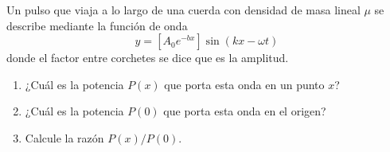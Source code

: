 \item Un pulso que viaja a lo largo de una cuerda con densidad de masa lineal $\mu$ se describe mediante la función de onda
$$ y = \left[ A_0 e^{-bx} \right] \sin(kx - \omega t) $$
donde el factor entre corchetes se dice que es la amplitud.
\begin{enumerate}
    \item ¿Cuál es la potencia $P(x)$ que porta esta onda en un punto $x$?
    \item ¿Cuál es la potencia $P(0)$ que porta esta onda en el origen?
    \item Calcule la razón $P(x)/P(0)$.
\end{enumerate}